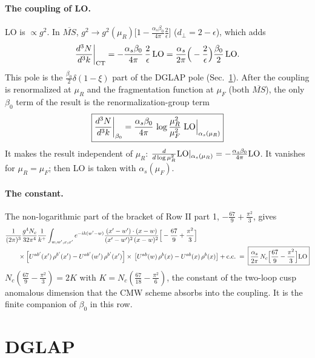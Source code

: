 \documentclass[9pt]{article}
\numberwithin{equation}{section}
\begin{document}
\paragraph{The coupling of LO.} LO is $\propto g^2$. In $\overline{MS}$, $g^2\to g^2(\mu_R)\big[1-\frac{\alpha_s\beta_0}{4\pi}\frac{2}{\epsilon}\big]$ ($d_\perp=2-\epsilon$), which adds
\begin{equation}
\frac{d^3N}{d^3k}\bigg|_{\rm CT}=-\frac{\alpha_s\beta_0}{4\pi}\,\frac{2}{\epsilon}\,{\rm LO}=\frac{\alpha_s}{2\pi}\Big(-\frac{2}{\epsilon}\Big)\frac{\beta_0}{2}\,{\rm LO}.
\label{eq:ct}
\end{equation}
This pole is the $\frac{\beta_0}{2}\delta(1-\xi)$ part of the DGLAP pole (Sec.~\ref{sec:dglap}). After the coupling is renormalized at $\mu_R$ and the fragmentation function at $\mu_F$ (both $\overline{MS}$), the only $\beta_0$ term of the result is the renormalization-group term
\begin{equation}
\boxed{\frac{d^3N}{d^3k}\bigg|_{\beta_0}=\frac{\alpha_s\beta_0}{4\pi}\,\log\frac{\mu_R^2}{\mu_F^2}\;{\rm LO}\Big|_{\alpha_s(\mu_R)}}
\label{eq:rg}
\end{equation}
It makes the result independent of $\mu_R$: $\frac{d}{d\log\mu_R^2}{\rm LO}|_{\alpha_s(\mu_R)}=-\frac{\alpha_s\beta_0}{4\pi}{\rm LO}$. It vanishes for $\mu_R=\mu_F$; then LO is taken with $\alpha_s(\mu_F)$.

\paragraph{The constant.} The non-logarithmic part of the bracket of Row II part 1, $-\frac{67}{9}+\frac{\pi^2}{3}$, gives
\begin{align}
&\frac{1}{(2\pi)^{3}}\frac{g^{4}N_{c}}{32\pi^{4}}\frac{1}{k^{+}}\int_{w,w',x,x'}e^{-ik(w'-w)}\frac{(x'-w')\cdot (x-w)}{(x'-w')^{2}\, (x-w)^{2}}\Big[-\frac{67}{9}+\frac{\pi^{2}}{3}\Big]\notag\\
&\qquad\times\left[U^{ab'}(x')\,\rho^{b'}(x') - U^{ab'}(w')\,\rho^{b'}(x')\right]\times\,\left[U^{ab}(w)\,\rho^{b}(x) - U^{ab}(x)\,\rho^{b}(x)\right]+{\rm c.c.}\;=\;\boxed{\frac{\alpha_s}{2\pi}\,N_c\Big[\frac{67}{9}-\frac{\pi^2}{3}\Big]{\rm LO}}
\label{eq:cmw}
\end{align}
$N_c(\frac{67}{9}-\frac{\pi^2}{3})=2K$ with $K=N_c(\frac{67}{18}-\frac{\pi^2}{6})$, the constant of the two-loop cusp anomalous dimension that the CMW scheme absorbs into the coupling. It is the finite companion of $\beta_0$ in this row.

\section{DGLAP}\label{sec:dglap}
\end{document}
